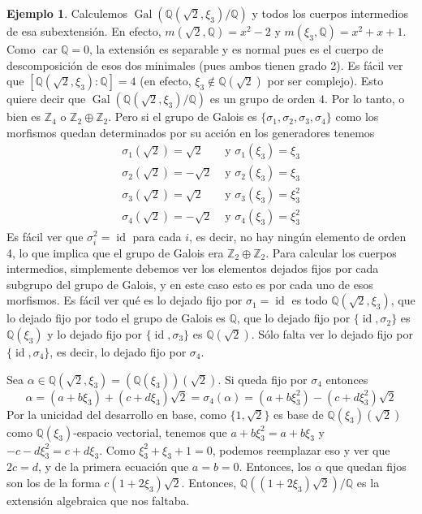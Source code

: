 \documentclass[12pt]{book}
\theoremstyle{definition}
\newtheorem{ex}[teo]{Ejemplo}
\newcommand{\ZZ}{\mathbb{Z}}      %
\newcommand{\QQ}{\mathbb{Q}}
\DeclareMathOperator{\id}{id}
\DeclareMathOperator{\car}{car}
\DeclareMathOperator{\Gal}{Gal}
\begin{document}
\begin{ex}
Calculemos $\Gal(\QQ(\sqrt{2},\xi_3)/\QQ)$ y todos los cuerpos intermedios de esa subextensión. En efecto, $m(\sqrt{2},\QQ)=x^2 - 2$ y $m(\xi_3,\QQ)=x^2 + x + 1$. Como $\car \QQ=0$, la extensión es separable y es normal pues es el cuerpo de descomposición de esos dos minimales (pues ambos tienen grado 2). Es fácil ver que $[\QQ(\sqrt{2},\xi_3):\QQ]=4$ (en efecto, $\xi_3\notin \QQ(\sqrt{2})$ por ser complejo). Esto quiere decir que $\Gal(\QQ(\sqrt{2},\xi_3)/\QQ)$ es un grupo de orden $4$. Por lo tanto, o bien es $\ZZ_4$ o $\ZZ_2\oplus\ZZ_2$. Pero si el grupo de Galois es $\{\sigma_1,\sigma_2,\sigma_3,\sigma_4\}$ como los morfismos quedan determinados por su acción en los generadores tenemos \begin{align*} \sigma_1(\sqrt{2})=\sqrt{2} &\text{ y } \sigma_1(\xi_3)=\xi_3 \\ \sigma_2(\sqrt{2})=-\sqrt{2} &\text{ y } \sigma_2(\xi_3)=\xi_3 \\ \sigma_3(\sqrt{2})=\sqrt{2} &\text{ y } \sigma_3(\xi_3)=\xi_3^2 \\ \sigma_4(\sqrt{2})=-\sqrt{2} &\text{ y } \sigma_4(\xi_3)=\xi_3^2 \end{align*} Es fácil ver que $\sigma_i^2 =\id$ para cada $i$, es decir, no hay ningún elemento de orden 4, lo que implica que el grupo de Galois era $\ZZ_2\oplus\ZZ_2$. Para calcular los cuerpos intermedios, simplemente debemos ver los elementos dejados fijos por cada subgrupo del grupo de Galois, y en este caso esto es por cada uno de esos morfismos. Es fácil ver qué es lo dejado fijo por $\sigma_1=\id$ es todo $\QQ(\sqrt{2},\xi_3)$, que lo dejado fijo por todo el grupo de Galois es $\QQ$, que lo dejado fijo por $\{\id,\sigma_2\}$ es $\QQ(\xi_3)$ y lo dejado fijo por $\{\id,\sigma_3\}$ es $\QQ(\sqrt{2})$. Sólo falta ver lo dejado fijo por $\{\id,\sigma_4\}$, es decir, lo dejado fijo por $\sigma_4$.

Sea $\alpha\in\QQ(\sqrt{2},\xi_3) = (\QQ(\xi_3))(\sqrt{2})$. Si queda fijo por $\sigma_4$ entonces $$\alpha = (a+b\xi_3) + (c+d\xi_3)\sqrt{2} = \sigma_4(\alpha) = (a + b\xi_3^2) - (c+d\xi_3^2)\sqrt{2}$$ Por la unicidad del desarrollo en base, como $\{1,\sqrt{2}\}$ es base de $\QQ(\xi_3)(\sqrt{2})$ como $\QQ(\xi_3)$-espacio vectorial, tenemos que $a+b\xi_3^2 = a+b\xi_3$ y $-c-d\xi_3^2 = c+d\xi_3$. Como $\xi_3^2 + \xi_3 + 1=0$, podemos reemplazar eso y ver que $2c=d$, y de la primera ecuación que $a=b=0$.  Entonces, los $\alpha$ que quedan fijos son los de la forma $c(1+2\xi_3)\sqrt{2}$. Entonces, $\QQ((1+2\xi_3)\sqrt{2})/\QQ$ es la extensión algebraica que nos faltaba.
\end{ex}
\end{document}
